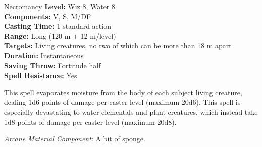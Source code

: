 {Necromancy}
{
	\textbf{Level:}
	Wiz 8, Water 8\\
	\textbf{Components:}
	V, S, M/DF\\
	\textbf{Casting Time:}
	1 standard action\\
	\textbf{Range:}
	Long (120 m + 12 m/level)\\
	\textbf{Targets:}
	Living creatures, no two of which can be more than 18 m apart\\
	\textbf{Duration:}
	Instantaneous\\
	\textbf{Saving Throw:}
	Fortitude half\\
	\textbf{Spell Resistance:}
	Yes\\
}
{
	This spell evaporates moisture from the body of each subject living creature, dealing 1d6 points of damage per caster level (maximum 20d6). This spell is especially devastating to water elementals and plant creatures, which instead take 1d8 points of damage per caster level (maximum 20d8).

	\textit{Arcane Material Component}:
	A bit of sponge.

}
